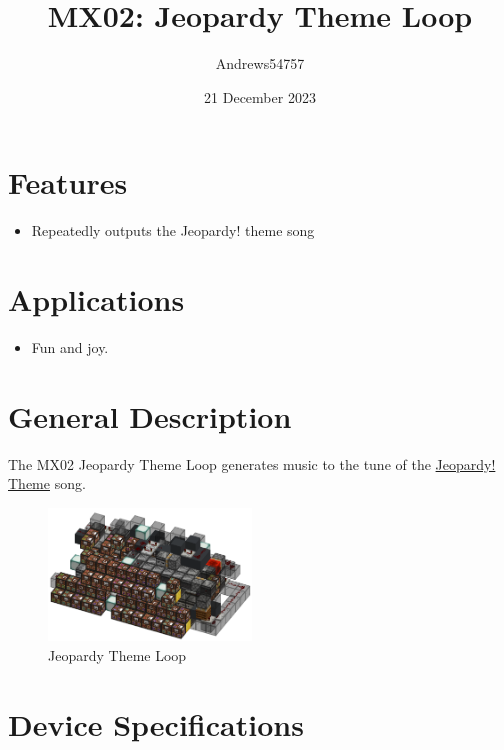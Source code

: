 \documentclass[10pt]{datasheet}
\title{MX02: Jeopardy Theme Loop}
\author{Andrews54757}
\date{21 December 2023}
\begin{document}
\maketitle

\section{Features}

\begin{itemize}
\item{Repeatedly outputs the Jeopardy! theme song}
\end{itemize}

\section{Applications}

\begin{itemize}
\item{Fun and joy.}
\end{itemize}

\section{General Description}
The MX02 Jeopardy Theme Loop generates music to the tune of the \href{https://www.youtube.com/watch?v=vWuQVpBeqLs}{Jeopardy! Theme} song.

\vfill\break

\begin{figure}[h]
    \centering
    \includegraphics[width=0.48\textwidth]{jeopardy.png}
    \caption{\centering Jeopardy Theme Loop}
\end{figure}

\onecolumn

\section{Device Specifications}
\end{document}
